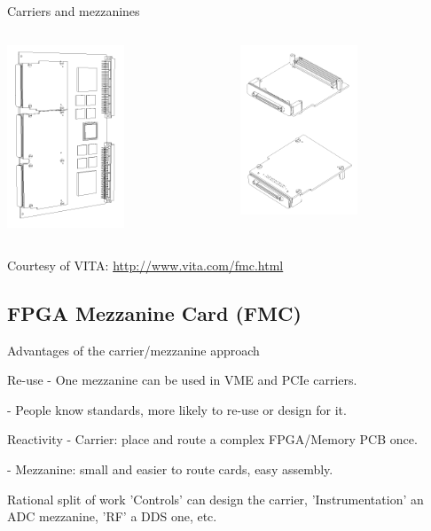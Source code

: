 \documentclass[compress,red]{beamer}
\begin{document}
\begin{frame}{Carriers and mezzanines}
 \begin{columns}
 \begin{column}{5cm}
  \begin{center}
   \includegraphics[width=3.5cm]{carrier.png}%
  \end{center}
 \end{column}
 \begin{column}{5cm}
  \begin{center}
   \includegraphics[width=3.5cm]{single_width1.png}%
  \end{center}
 \end{column}
 \end{columns}
 Courtesy of VITA: \url{http://www.vita.com/fmc.html}
\end{frame}

\subsection{FPGA Mezzanine Card (FMC)}

\begin{frame}{Advantages of the carrier/mezzanine approach}
	\begin{block}{Re-use}
		- One mezzanine can be used in VME and PCIe carriers.

		- People know standards, more likely to re-use or design for it.
	\end{block}
	\begin{block}{Reactivity}
	    - Carrier: place and route a complex FPGA/Memory PCB once.

	- Mezzanine: small and easier to route cards, easy assembly.
	\end{block}
	\begin{block}{Rational split of work}
	    'Controls' can design the carrier, 'Instrumentation' an ADC mezzanine, 'RF' a DDS one, etc.
	\end{block}
\end{frame}
\end{document}
